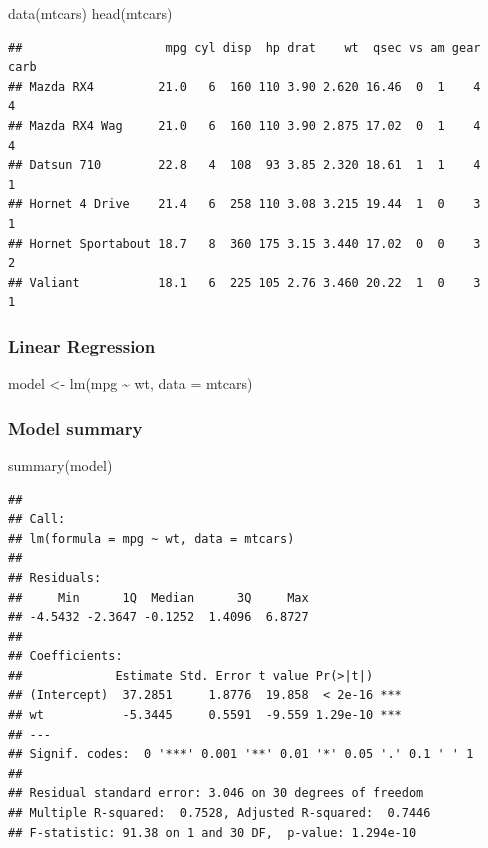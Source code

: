 \documentclass[
]{article}
\newenvironment{Shaded}{\begin{snugshade}}{\end{snugshade}}
\newcommand{\AttributeTok}[1]{\textcolor[rgb]{0.77,0.63,0.00}{#1}}
\newcommand{\FunctionTok}[1]{\textcolor[rgb]{0.00,0.00,0.00}{#1}}
\newcommand{\NormalTok}[1]{#1}
\newcommand{\OtherTok}[1]{\textcolor[rgb]{0.56,0.35,0.01}{#1}}
\newcommand{\SpecialCharTok}[1]{\textcolor[rgb]{0.00,0.00,0.00}{#1}}
\begin{document}
\begin{Shaded}
\begin{Highlighting}[]
\FunctionTok{data}\NormalTok{(mtcars)}
\FunctionTok{head}\NormalTok{(mtcars)}
\end{Highlighting}
\end{Shaded}

\begin{verbatim}
##                    mpg cyl disp  hp drat    wt  qsec vs am gear carb
## Mazda RX4         21.0   6  160 110 3.90 2.620 16.46  0  1    4    4
## Mazda RX4 Wag     21.0   6  160 110 3.90 2.875 17.02  0  1    4    4
## Datsun 710        22.8   4  108  93 3.85 2.320 18.61  1  1    4    1
## Hornet 4 Drive    21.4   6  258 110 3.08 3.215 19.44  1  0    3    1
## Hornet Sportabout 18.7   8  360 175 3.15 3.440 17.02  0  0    3    2
## Valiant           18.1   6  225 105 2.76 3.460 20.22  1  0    3    1
\end{verbatim}

\hypertarget{linear-regression}{%
\subsubsection{Linear Regression}\label{linear-regression}}

\begin{Shaded}
\begin{Highlighting}[]
\NormalTok{model }\OtherTok{\textless{}{-}} \FunctionTok{lm}\NormalTok{(mpg }\SpecialCharTok{\textasciitilde{}}\NormalTok{ wt, }\AttributeTok{data =}\NormalTok{ mtcars)}
\end{Highlighting}
\end{Shaded}

\hypertarget{model-summary}{%
\subsubsection{Model summary}\label{model-summary}}

\begin{Shaded}
\begin{Highlighting}[]
\FunctionTok{summary}\NormalTok{(model)}
\end{Highlighting}
\end{Shaded}

\begin{verbatim}
## 
## Call:
## lm(formula = mpg ~ wt, data = mtcars)
## 
## Residuals:
##     Min      1Q  Median      3Q     Max 
## -4.5432 -2.3647 -0.1252  1.4096  6.8727 
## 
## Coefficients:
##             Estimate Std. Error t value Pr(>|t|)    
## (Intercept)  37.2851     1.8776  19.858  < 2e-16 ***
## wt           -5.3445     0.5591  -9.559 1.29e-10 ***
## ---
## Signif. codes:  0 '***' 0.001 '**' 0.01 '*' 0.05 '.' 0.1 ' ' 1
## 
## Residual standard error: 3.046 on 30 degrees of freedom
## Multiple R-squared:  0.7528, Adjusted R-squared:  0.7446 
## F-statistic: 91.38 on 1 and 30 DF,  p-value: 1.294e-10
\end{verbatim}
\end{document}
